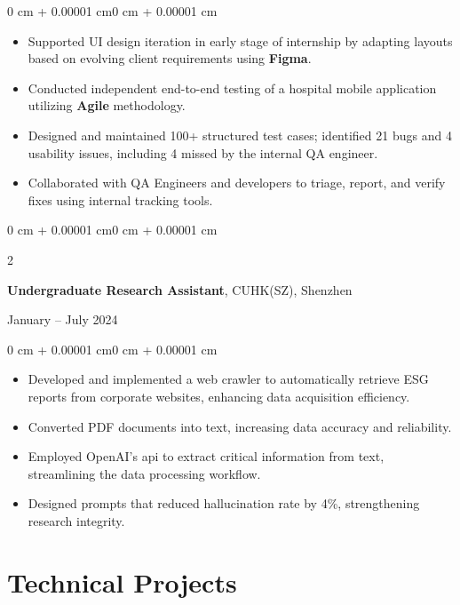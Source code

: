 \documentclass[10pt, letterpaper]{article}
\newenvironment{highlights}{
    \begin{itemize}[
        topsep=0.10 cm,
        parsep=0.10 cm,
        partopsep=0pt,
        itemsep=0pt,
        leftmargin=0 cm + 10pt
    ]
}{
    \end{itemize}
}
\newenvironment{onecolentry}{
    \begin{adjustwidth}{0 cm + 0.00001 cm}{0 cm + 0.00001 cm}
}{
    \end{adjustwidth}
}
\newenvironment{twocolentry}[2][]{
    \onecolentry
    \def\secondColumn{#2}
    \setcolumnwidth{\fill, 4.5 cm}
    \begin{paracol}{2}
}{
    \switchcolumn \raggedleft \secondColumn
    \end{paracol}
    \endonecolentry
}
\begin{document}
    \vspace{0.10 cm}
    \begin{onecolentry}
        \begin{highlights}
            \item Supported UI design iteration in early stage of internship 
            by adapting layouts based on evolving client requirements using \textbf{Figma}.
            \item Conducted independent end-to-end testing of a hospital mobile application 
            utilizing \textbf{Agile} methodology.
            \item Designed and maintained 100+ structured test cases; 
            identified 21 bugs and 4 usability issues, including 4 missed by the internal QA engineer.
            \item Collaborated with QA Engineers and developers to triage, report, 
            and verify fixes using internal tracking tools.
        \end{highlights}
    \end{onecolentry}

    \vspace{0.20 cm}
    
    \begin{twocolentry}{January -- July 2024}
        \textbf{Undergraduate Research Assistant}, CUHK(SZ), Shenzhen
    \end{twocolentry}
    
    \vspace{0.10 cm}
    \begin{onecolentry}
        \begin{highlights}
            \item Developed and implemented a web crawler to automatically retrieve ESG reports from corporate websites, enhancing data acquisition efficiency.
            \item Converted PDF documents into text, increasing data accuracy and reliability.
            \item Employed OpenAI's api to extract critical information from text, streamlining the data processing workflow.
            \item Designed prompts that reduced hallucination rate by 4\%, strengthening research integrity.
        \end{highlights}
    \end{onecolentry}

    \section{Technical Projects}
    
\end{document}

